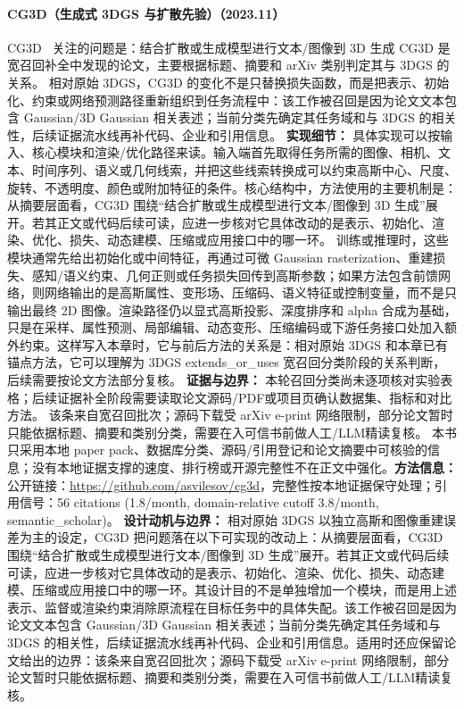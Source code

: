 \paragraph{CG3D（生成式 3DGS 与扩散先验）（2023.11）}
CG3D~\cite{2311_17907} 关注的问题是：结合扩散或生成模型进行文本/图像到 3D 生成 CG3D 是宽召回补全中发现的论文，主要根据标题、摘要和 arXiv 类别判定其与 3DGS 的关系。
相对原始 3DGS，CG3D 的变化不是只替换损失函数，而是把表示、初始化、约束或网络预测路径重新组织到任务流程中：该工作被召回是因为论文文本包含 Gaussian/3D Gaussian 相关表述；当前分类先确定其任务域和与 3DGS 的相关性，后续证据流水线再补代码、企业和引用信息。
\textbf{实现细节：} 具体实现可以按输入、核心模块和渲染/优化路径来读。输入端首先取得任务所需的图像、相机、文本、时间序列、语义或几何线索，并把这些线索转换成可以约束高斯中心、尺度、旋转、不透明度、颜色或附加特征的条件。核心结构中，方法使用的主要机制是：从摘要层面看，CG3D 围绕“结合扩散或生成模型进行文本/图像到 3D 生成”展开。若其正文或代码后续可读，应进一步核对它具体改动的是表示、初始化、渲染、优化、损失、动态建模、压缩或应用接口中的哪一环。 训练或推理时，这些模块通常先给出初始化或中间特征，再通过可微 Gaussian rasterization、重建损失、感知/语义约束、几何正则或任务损失回传到高斯参数；如果方法包含前馈网络，则网络输出的是高斯属性、变形场、压缩码、语义特征或控制变量，而不是只输出最终 2D 图像。渲染路径仍以显式高斯投影、深度排序和 alpha 合成为基础，只是在采样、属性预测、局部编辑、动态变形、压缩编码或下游任务接口处加入额外约束。这样写入本章时，它与前后方法的关系是：相对原始 3DGS 和本章已有锚点方法，它可以理解为 3DGS extends\_or\_uses 宽召回分类阶段的关系判断，后续需要按论文方法部分复核。
\textbf{证据与边界：} 本轮召回分类尚未逐项核对实验表格；后续证据补全阶段需要读取论文源码/PDF或项目页确认数据集、指标和对比方法。 该条来自宽召回批次；源码下载受 arXiv e-print 网络限制，部分论文暂时只能依据标题、摘要和类别分类，需要在入可信书前做人工/LLM精读复核。 本书只采用本地 paper pack、数据库分类、源码/引用登记和论文摘要中可核验的信息；没有本地证据支撑的速度、排行榜或开源完整性不在正文中强化。\textbf{方法信息：} 公开链接：\url{https://github.com/asvilesov/cg3d}，完整性按本地证据保守处理；引用信号：56 citations (1.8/month, domain-relative cutoff 3.8/month, semantic\_scholar)。
\textbf{设计动机与边界：} 相对原始 3DGS 以独立高斯和图像重建误差为主的设定，CG3D 把问题落在以下可实现的改动上：从摘要层面看，CG3D 围绕“结合扩散或生成模型进行文本/图像到 3D 生成”展开。若其正文或代码后续可读，应进一步核对它具体改动的是表示、初始化、渲染、优化、损失、动态建模、压缩或应用接口中的哪一环。其设计目的不是单独增加一个模块，而是用上述表示、监督或渲染约束消除原流程在目标任务中的具体失配。该工作被召回是因为论文文本包含 Gaussian/3D Gaussian 相关表述；当前分类先确定其任务域和与 3DGS 的相关性，后续证据流水线再补代码、企业和引用信息。适用时还应保留论文给出的边界：该条来自宽召回批次；源码下载受 arXiv e-print 网络限制，部分论文暂时只能依据标题、摘要和类别分类，需要在入可信书前做人工/LLM精读复核。
